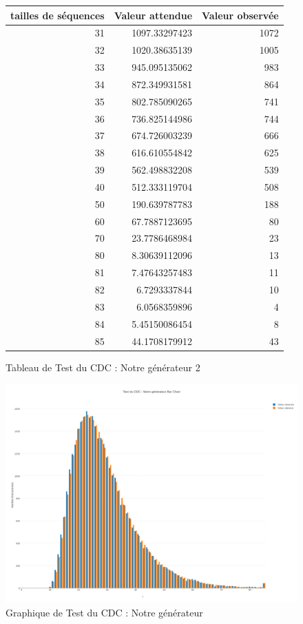 \documentclass[10pt,a4paper]{article}
\begin{document}
\newpage

\begin{figure}[h]
\centering
\begin{tabular}{|r|r|r|}
\hline
tailles de séquences  & Valeur attendue & Valeur observée\\
\hline
31 & 1097.33297423 & 1072\\
32 & 1020.38635139 & 1005\\
33 & 945.095135062 & 983\\
34 & 872.349931581 & 864\\
35 & 802.785090265 & 741\\
36 & 736.825144986 & 744\\
37 & 674.726003239 & 666\\
38 & 616.610554842 & 625\\
39 & 562.498832208 & 539\\
40 & 512.333119704 & 508\\
50 & 190.639787783 & 188\\
60 & 67.7887123695 & 80\\
70 & 23.7786468984 & 23\\
80 & 8.30639112096 & 13\\
81 & 7.47643257483 & 11\\
82 & 6.7293337844 & 10\\
83 & 6.0568359896 & 4\\
84 & 5.45150086454 & 8\\
85 & 44.1708179912 & 43\\
\hline
\end{tabular}
\caption{Tableau de Test du CDC : Notre générateur 2}
\end{figure}

\newpage

\begin{figure}[h]
\centering
\includegraphics[scale=0.30]{../chart_images/cdc_ours.png}
\caption{Graphique de Test du CDC : Notre générateur}
\end{figure}
\end{document}
